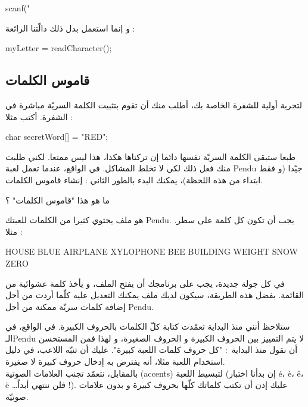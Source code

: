 \begin{Csource}
scanf("%
\end{Csource}

و إنما استعمل بدل ذلك دالّتنا الرائعة :

\begin{Csource}
myLetter = readCharacter();
\end{Csource}

\subsection{قاموس الكلمات}
لتجربة أولية للشفرة الخاصة بك، أطلب منك أن تقوم بتثبيت الكلمة السريّة مباشرة في الشفرة. أكتب مثلا :

\begin{Csource}
char secretWord[] = "RED";
\end{Csource}

طبعا ستبقى الكلمة السريّة نفسها دائما إن تركناها هكذا، هذا ليس ممتعا. لكني طلبت منك فعل ذلك لكي لا تخلط المشاكل. في الواقع، عندما تعمل لعبة
\textenglish{Pendu}
جيّدا (و فقط ابتداء من هذه اللحظة)، يمكنك البدء بالطور الثاني : إنشاء قاموس الكلمات.

\begin{question}
ما هو هذا "قاموس الكلمات" ؟
\end{question}

هو ملف يحتوي كثيرا من الكلمات للعبتك
\textenglish{Pendu}.
يجب أن تكون كل كلمة على سطر. مثلا :

\begin{Console}
HOUSE
BLUE
AIRPLANE
XYLOPHONE
BEE
BUILDING
WEIGHT
SNOW
ZERO
\end{Console}

في كل جولة جديدة، يجب على برنامجك أن يفتح الملف، و يأخذ كلمة عشوائية من القائمة. بفضل هذه الطريقة، سيكون لديك ملف يمكنك التعديل عليه كلّما أردت من أجل إضافة كلمات سريّة ممكنة من أجل
\textenglish{Pendu}.

\begin{information}
ستلاحظ أنني منذ البداية تعمّدت كتابة كلّ الكلمات بالحروف الكبيرة. في الواقع، في الـ\textenglish{Pendu}
لا يتم التمييز بين الحروف الكبيرة و الحروف الصغيرة، و لهذا فمن المستحسن أن نقول منذ البداية~: "كل حروف كلمات اللعبة كبيرة". عليك أن تنبّه اللاعب، في دليل استخدام اللعبة مثلا، أنه يفترض به إدخال حروف كبيرة لا صغيرة.\\
بالمقابل، نتعمّد تجنب العلامات الصوتية
(\textenglish{accents})
لتبسيط اللعبة (إن بدأنا اختبار \textenglish{é}، \textenglish{è}، \textenglish{ê}، \textenglish{ë} \dots فلن ننتهي أبداً !). عليك إذن أن تكتب كلماتك كلّها بحروف كبيرة و بدون علامات صوتيّة.
\end{information}

